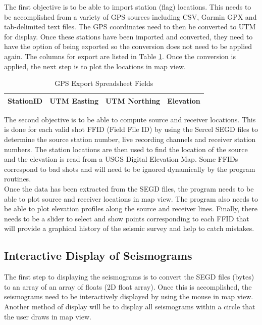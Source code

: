 \documentclass[12pt]{article}
\begin{document}
The first objective is to be able to import station (flag) locations. This needs to be accomplished from a variety of GPS sources including CSV, Garmin GPX and tab-delimited text files. The GPS coordinates need to then be converted to UTM for display. Once these stations have been imported and converted, they need to have the option of being exported so the conversion does not need to be applied again. The columns for export are listed in Table \ref{TAB:GPS}. Once the conversion is applied, the next step is to plot the locations in map view.

\begin{table}[H]
\caption{GPS Export Spreadsheet Fields}
\centering
\begin{tabular}{ c | c | c | c}
  \hline                  
  StationID & UTM Easting & UTM Northing & Elevation \\
  \hline
\end{tabular}
\label{TAB:GPS}
\end{table}

The second objective is to be able to compute source and receiver locations. This is done for each valid shot FFID (Field File ID) by using the Sercel SEGD files to determine the source station number, live recording channels and receiver station numbers. The station locations are then used to find the location of the source and the elevation is read from a USGS Digital Elevation Map. Some FFIDs correspond to bad shots and will need to be ignored dynamically by the program routines. \\

Once the data has been extracted from the SEGD files, the program needs to be able to plot source and receiver locations in map view. The program also needs to be able to plot elevation profiles along the source and receiver lines. Finally, there needs to be a slider to select and show points corresponding to each FFID that will provide a graphical history of the seismic survey and help to catch mistakes. 

\subsection{Interactive Display of Seismograms}

The first step to displaying the seismograms is to convert the SEGD files (bytes) to an array of an array of floats (2D float array). Once this is accomplished, the seismograms need to be interactively displayed by using the mouse in map view. Another method of display will be to display all seismograms within a circle that the user draws in map view. \\
\end{document}

